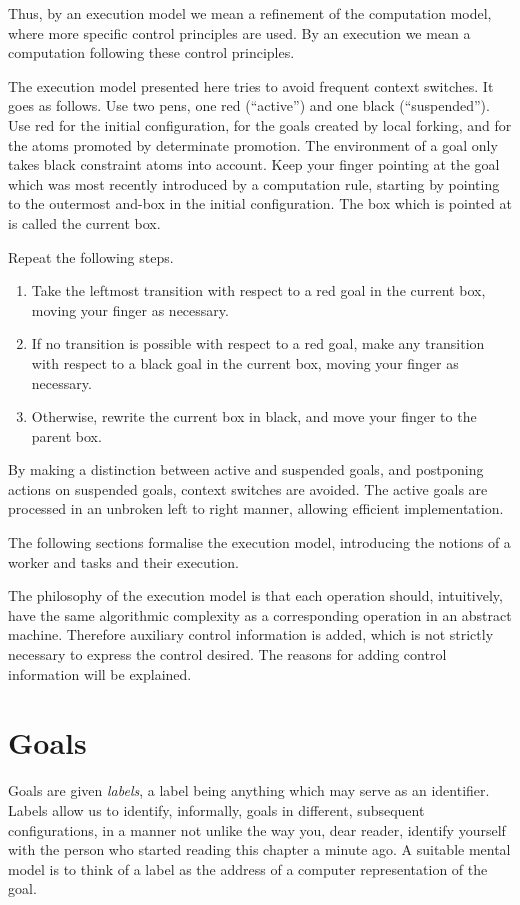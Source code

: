 Thus, by an execution model we mean a refinement of the computation model, 
where more specific control principles are used.  By an execution we mean a 
computation following these control principles.

The execution model presented here tries to avoid frequent context
switches.  It goes as follows.  Use two pens, one red (``active'') and
one black (``suspended'').  Use red for the initial configuration, for
the goals created by local forking, and for the atoms promoted by
determinate promotion.  The environment of a goal only takes black
constraint atoms into account.  Keep your finger pointing at the goal
which was most recently introduced by a computation rule, starting by
pointing to the outermost and-box in the initial configuration.  The
box which is pointed at is called the current box.

Repeat the following steps.
%
\begin{enumerate}
\item
Take the leftmost transition with respect to a red goal in the
current box, moving your finger as necessary.
\item
If no transition is possible with respect to a red goal, make
any transition with respect to a black goal in the current box, moving
your finger as necessary.
\item
Otherwise, rewrite the current box in black, and move your
finger to the parent box.
\end{enumerate}
%
By making a distinction between active and suspended goals, and
postponing actions on suspended goals, context switches are avoided.
The active goals are processed in an unbroken left to right manner,
allowing efficient implementation.

The following sections formalise the execution model, introducing the
notions of a worker and tasks and their execution.

The philosophy of the execution model is that each operation should,
intuitively, have the same algorithmic complexity as a corresponding
operation in an abstract machine.  Therefore auxiliary control
information is added, which is not strictly necessary to express the
control desired.  The reasons for adding control information will be
explained.

\section{Goals}

Goals are given {\em labels}, a label being anything which may serve
as an identifier.  Labels allow us to identify, informally, goals in
different, subsequent configurations, in a manner not unlike the way
you, dear reader, identify yourself with the person who started
reading this chapter a minute ago.  A suitable mental model is to
think of a label as the address of a computer representation of the
goal.

